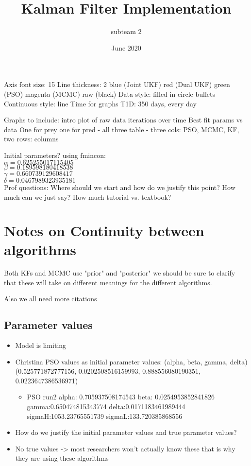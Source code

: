 \documentclass{article}
\title{Kalman Filter Implementation}
\author{subteam 2}
\date{June 2020}
\begin{document}
\maketitle

Axis font size: 15
Line thickness: 2
blue (Joint UKF)
red (Dual UKF)
green (PSO)
magenta (MCMC)
raw (black)
Data style: filled in circle bullets
Continuous style: line
Time for graphs T1D: 350 days, every day


Graphs to include:
intro plot of raw data
iterations over time
Best fit params vs data
One for prey one for pred - all three
table - three cols: PSO, MCMC, KF, two rows: columns

Initial parameters? using fmincon:\\
$\alpha = 0.625255017115405$\\
$\beta = 0.189598180418538$\\
$\gamma = 0.660739129608417$\\
$\delta = 0.0467989323935181$\\

Prof questions:
Where should we start and how do we justify this point?
How much can we just say?
How much tutorial vs. textbook?

\section{Notes on Continuity between algorithms}
Both KFs and MCMC use "prior" and "posterior" we should be sure to clarify that these will take on different meanings for the different algorithms.
\par Also we all need more citations
\subsection{Parameter values}
\begin{itemize}
    \item Model is limiting 
    \item Christina PSO values as initial parameter values: (alpha, beta, gamma, delta)  (0.525771872777156,	0.0202508516159993,	0.888556080190351,	0.0223647386536971)
    \begin{itemize}
        \item PSO run2 alpha: 0.705937508174543	beta: 0.0254953852841826	 gamma:0.650474815343774	delta:0.0171183461989444	sigmaH:1053.23765551739	sigmaL:133.720385868556
    \end{itemize}
    \item How do we justify the initial parameter values and true parameter values?
    \item No true values -> most researchers won't actually know these that is why they are using these algorithms
\end{itemize}
\end{document}
